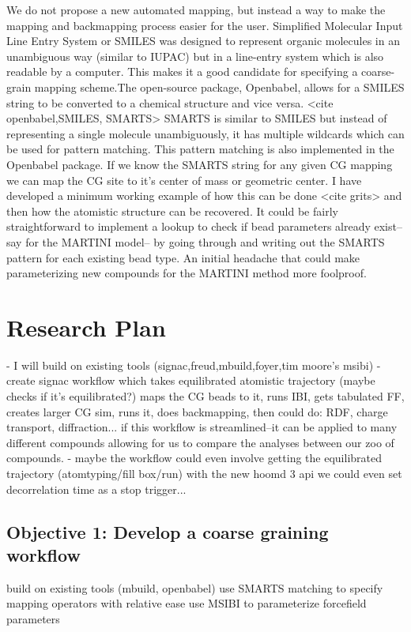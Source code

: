 We do not propose a new automated mapping, but instead a way to make the mapping and backmapping process easier for the user.
Simplified Molecular Input Line Entry System or SMILES \cite{Weininger} was designed to represent organic molecules in an unambiguous way (similar to IUPAC) but in a line-entry system which is also readable by a computer.
This makes it a good candidate for specifying a coarse-grain mapping scheme.The open-source package, Openbabel, allows for a SMILES string to be converted to a chemical structure and vice versa.
<cite openbabel,SMILES, SMARTS> SMARTS is similar to SMILES but instead of representing a single molecule unambiguously, it has multiple wildcards which can be used for pattern matching.
This pattern matching is also implemented in the Openbabel package.
If we know the SMARTS string for any given CG mapping we can map the CG site to it's center of mass or geometric center.
I have developed a minimum working example of how this can be done <cite grits> and then how the atomistic structure can be recovered.
It could be fairly straightforward to implement a lookup to check if bead parameters already exist--say for the MARTINI model-- by going through and writing out the SMARTS pattern for each existing bead type.
An initial headache that could make parameterizing new compounds for the MARTINI method more foolproof.

\section*{Research Plan}
- I will build on existing tools (signac,freud,mbuild,foyer,tim moore's msibi)
- create signac workflow which takes equilibrated atomistic trajectory (maybe checks if it's equilibrated?) maps the CG beads to it, runs IBI, gets tabulated FF, creates larger CG sim, runs it, does backmapping, then could do: RDF, charge transport, diffraction...
if this workflow is streamlined--it can be applied to many different compounds allowing for us to compare the analyses between our zoo of compounds.
- maybe the workflow could even involve getting the equilibrated trajectory (atomtyping/fill box/run) with the new hoomd 3 api we could even set decorrelation time as a stop trigger...
\subsection*{Objective 1: Develop a coarse graining workflow}
build on existing tools (mbuild, openbabel)
use SMARTS matching to specify mapping operators with relative ease
use MSIBI to parameterize forcefield parameters

